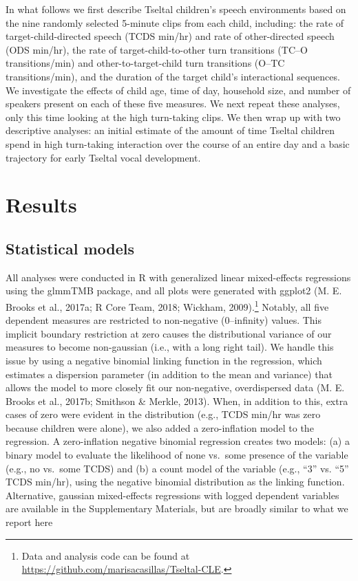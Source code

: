 \documentclass[floatsintext,man]{apa6}
\theoremstyle{definition}
\theoremstyle{definition}
\theoremstyle{definition}
\theoremstyle{remark}
\begin{document}
In what follows we first describe Tseltal children's speech environments
based on the nine randomly selected 5-minute clips from each child,
including: the rate of target-child-directed speech (TCDS min/hr) and
rate of other-directed speech (ODS min/hr), the rate of
target-child-to-other turn transitions (TC--O transitions/min) and
other-to-target-child turn transitions (O--TC transitions/min), and the
duration of the target child's interactional sequences. We investigate
the effects of child age, time of day, household size, and number of
speakers present on each of these five measures. We next repeat these
analyses, only this time looking at the high turn-taking clips. We then
wrap up with two descriptive analyses: an initial estimate of the amount
of time Tseltal children spend in high turn-taking interaction over the
course of an entire day and a basic trajectory for early Tseltal vocal
development.

\section{Results}\label{results}

\subsection{Statistical models}\label{statistical-models}

All analyses were conducted in R with generalized linear mixed-effects
regressions using the glmmTMB package, and all plots were generated with
ggplot2 (M. E. Brooks et al., 2017a; R Core Team, 2018; Wickham,
2009).\footnote{Data and analysis code can be found at
  \url{https://github.com/marisacasillas/Tseltal-CLE}.} Notably, all
five dependent measures are restricted to non-negative (0--infinity)
values. This implicit boundary restriction at zero causes the
distributional variance of our measures to become non-gaussian (i.e.,
with a long right tail). We handle this issue by using a negative
binomial linking function in the regression, which estimates a
dispersion parameter (in addition to the mean and variance) that allows
the model to more closely fit our non-negative, overdispersed data (M.
E. Brooks et al., 2017b; Smithson \& Merkle, 2013). When, in addition to
this, extra cases of zero were evident in the distribution (e.g., TCDS
min/hr was zero because children were alone), we also added a
zero-inflation model to the regression. A zero-inflation negative
binomial regression creates two models: (a) a binary model to evaluate
the likelihood of none vs.~some presence of the variable (e.g., no
vs.~some TCDS) and (b) a count model of the variable (e.g., \enquote{3}
vs. \enquote{5} TCDS min/hr), using the negative binomial distribution
as the linking function. Alternative, gaussian mixed-effects regressions
with logged dependent variables are available in the Supplementary
Materials, but are broadly similar to what we report here
\end{document}
